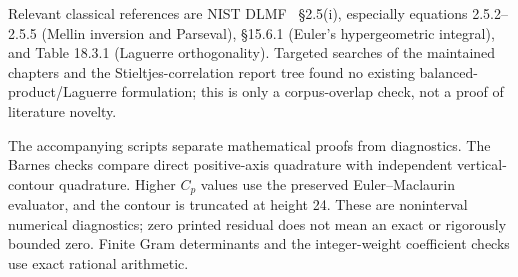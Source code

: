 Relevant classical references are NIST DLMF~\cite{stbil:classical}
\S2.5(i), especially
equations 2.5.2--2.5.5 (Mellin inversion and Parseval), \S15.6.1 (Euler's
hypergeometric integral), and Table 18.3.1 (Laguerre orthogonality).
Targeted searches of the maintained chapters and the Stieltjes-correlation
report tree found no existing balanced-product/Laguerre formulation;
this is only a corpus-overlap check, not a proof of literature novelty.

The accompanying scripts separate mathematical proofs from diagnostics.
The Barnes checks compare direct positive-axis quadrature with independent
vertical-contour quadrature.  Higher $C_p$ values use the preserved
Euler--Maclaurin evaluator, and the contour is truncated at height 24.
These are noninterval numerical diagnostics; zero printed residual does
not mean an exact or rigorously bounded zero.  Finite Gram determinants
and the integer-weight coefficient checks use exact rational arithmetic.
